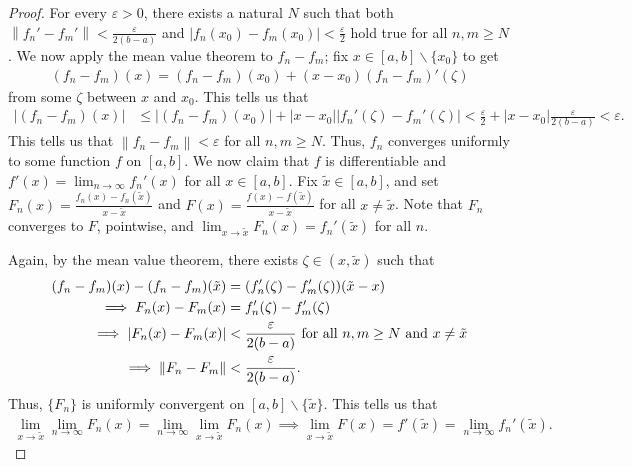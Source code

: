 \documentclass[15pt,a4paper]{book}
\theoremstyle{definition}
\newcommand{\abs}[1]{\left| #1 \right|} %
\newcommand{\norm}[1]{\left\lVert#1\right\rVert}
\begin{document}
\begin{proof}
    For every $\varepsilon > 0$, there exists a natural $N$ such that both $\norm{f_{n}'-f_{m}'} < \frac{\varepsilon}{2(b-a)}$ and $\abs{f_{n}(x_{0}) - f_{m}(x_{0})} < \frac{\varepsilon}{2}$ hold true for all $n,m \geq N$. We now apply the mean value theorem to $f_{n}-f_{m}$; fix $x \in [a,b]\backslash\{x_{0}\}$ to get
    \begin{align}
        (f_{n}-f_{m})(x) = (f_{n}-f_{m})(x_{0}) + (x-x_{0})(f_{n}-f_{m})'(\zeta)
    \end{align}
    from some $\zeta$ between $x$ and $x_{0}$. This tells us that
    \begin{align}
        \abs{(f_{n}-f_{m})(x)} &\leq \abs{(f_{n}-f_{m})(x_{0})} + \abs{x-x_{0}} \abs{f_{n}'(\zeta)-f_{m}'(\zeta)} < \frac{\varepsilon}{2} + \abs{x-x_{0}}\frac{\varepsilon}{2(b-a)} < \varepsilon.
    \end{align}
    This tells us that $\norm{f_{n}-f_{m}} < \varepsilon$ for all $n,m \geq N$. Thus, $f_{n}$ converges uniformly to some function $f$ on $[a,b]$. We now claim that $f$ is differentiable and $f'(x) = \lim_{n \to \infty}f_{n}'(x)$ for all $x \in [a,b]$. Fix $\tilde{x} \in [a,b]$, and set $F_{n}(x) = \frac{f_{n}(x)-f_{n}(\tilde{x})}{x-\tilde{x}}$ and $F(x) = \frac{f(x)-f(\tilde{x})}{x-\tilde{x}}$ for all $x \neq \tilde{x}$. Note that $F_{n}$ converges to $F$, pointwise, and $\lim_{x \to \tilde{x}} F_{n}(x) = f_{n}'(\tilde{x})$ for all $n$.

    Again, by the mean value theorem, there exists $\zeta \in (x,\tilde{x})$ such that
    \begin{align}
        (f_{n}-f_{m})(x)-(f_{n}-f_{m})(\tilde{x}) &= (f_{n}'(\zeta)-f_{m}'(\zeta)) (\tilde{x}-x) \\
        \implies F_{n}(x) - F_{m}(x) &= f_{n}'(\zeta) - f_{m}'(\zeta) \notag \\
        \implies \abs{F_{n}(x)-F_{m}(x)} &< \frac{\varepsilon}{2(b-a)} \text{ for all } n,m \geq N \text{ and } x \neq \tilde{x} \notag \\
        \implies \norm{F_{n}-F_{m}} &< \frac{\varepsilon}{2(b-a)}.
    \end{align}
    Thus, $\{F_{n}\}$ is uniformly convergent on $[a,b]\backslash\{\tilde{x}\}$. This tells us that
    \begin{align}
        \lim_{x \to \tilde{x}}\lim_{n \to \infty} F_{n}(x) = \lim_{n \to \infty}\lim_{x \to \tilde{x}} F_{n}(x) \implies \lim_{x \to \tilde{x}} F(x) = f'(\tilde{x}) = \lim_{n \to \infty} f_{n}'(\tilde{x}).
    \end{align}
\end{proof}
\end{document}
